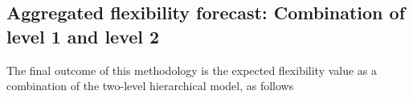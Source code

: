 


\begin{table}[htbp]
\centering
\caption{Results overview between the two models developed under level~2 of the hierarchical model for conditional flexibility estimation.}
\vspace*{3mm}
\label{tab:level2-scores}
\end{table}

\subsection{Aggregated flexibility forecast: Combination of level 1 and level 2}  \label{Sect:ResultsFinalOutcome} 
The final outcome of this methodology is the expected flexibility value as a combination of the two-level hierarchical model, as follows


